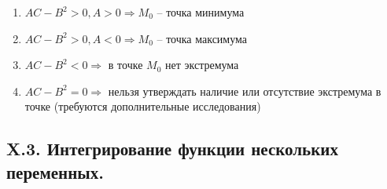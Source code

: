 \documentclass[12pt]{article}
\begin{document}
\begin{enumerate}
        \begin{enumerate}
            \item $AC - B^2 > 0, A > 0 \Longrightarrow M_0$ -- точка минимума
            \item $AC - B^2 > 0, A < 0 \Longrightarrow M_0$ -- точка максимума
            \item $AC - B^2 < 0 \Longrightarrow$ в точке $M_0$ нет экстремума
            \item $AC - B^2 = 0\Longrightarrow$ нельзя утверждать наличие или отсутствие экстремума в точке (требуются дополнительные исследования)
        \end{enumerate}

    \end{enumerate}

    \subsection{X.3. Интегрирование функции нескольких переменных.}
\end{document}
